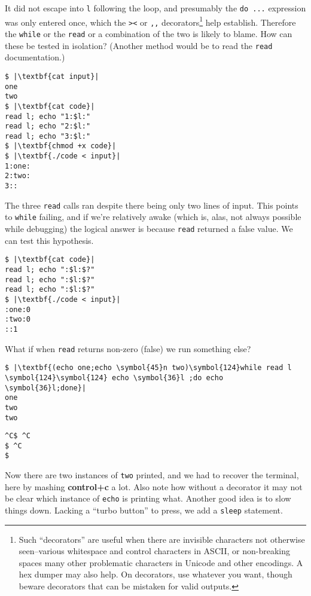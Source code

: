 \documentclass[10pt,a4paper]{article}
\begin{document}
It did not escape into \texttt{l} following the loop, and
presumably the \texttt{do ...} expression was only entered once, which
the \texttt{><} or \texttt{,,} decorators\footnote{Such ``decorators''
are useful when there are invisible characters not otherwise
seen--various whitespace and control characters in ASCII, or
non-breaking spaces many other problematic characters in Unicode and
other encodings. A hex dumper may also help. On decorators, use
whatever you want, though beware decorators that can be mistaken for
valid outputs.} help establish. Therefore the \texttt{while} or the
\texttt{read} or a combination of the two is likely to blame. How can
these be tested in isolation? (Another method would be to read the
\texttt{read} documentation.)

\begin{lstlisting}
$ |\textbf{cat input}|
one
two
$ |\textbf{cat code}|
read l; echo "1:$l:"
read l; echo "2:$l:"
read l; echo "3:$l:"
$ |\textbf{chmod +x code}|
$ |\textbf{./code < input}|
1:one:
2:two:
3::
\end{lstlisting}

The three \texttt{read} calls ran despite there being only two lines
of input. This points to \texttt{while} failing, and if we're
relatively awake (which is, alas, not always possible while debugging)
the logical answer is because \texttt{read} returned a false value. We
can test this hypothesis.

\begin{lstlisting}
$ |\textbf{cat code}|
read l; echo ":$l:$?"
read l; echo ":$l:$?"
read l; echo ":$l:$?"
$ |\textbf{./code < input}|
:one:0
:two:0
::1
\end{lstlisting}

What if when \texttt{read} returns non-zero (false) we run something else?

\begin{lstlisting}
$ |\textbf{(echo one;echo \symbol{45}n two)\symbol{124}while read l \symbol{124}\symbol{124} echo \symbol{36}l ;do echo \symbol{36}l;done}|
one
two
two
\end{lstlisting}
\clearpage
\begin{lstlisting}
^C$ ^C
$ ^C
$
\end{lstlisting}

Now there are two instances of \texttt{two} printed, and we had to
recover the terminal, here by mashing \textbf{control+c} a lot. Also
note how without a decorator it may not be clear which instance of
\texttt{echo} is printing what. Another good idea is to slow things
down. Lacking a ``turbo button'' to press, we add a \texttt{sleep}
statement.
\end{document}
